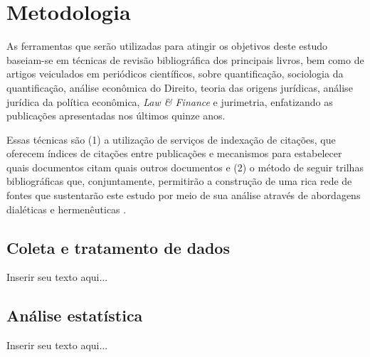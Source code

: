 
\chapter{Metodologia}
\label{chap_metodologia}

As ferramentas que serão utilizadas para atingir os objetivos deste estudo baseiam-se em técnicas de revisão bibliográfica dos principais livros, bem como de artigos veiculados em periódicos científicos, sobre quantificação, sociologia da quantificação, análise econômica do Direito, teoria das origens jurídicas, análise jurídica da política econômica, \emph{Law \& Finance} e jurimetria, enfatizando as publicações apresentadas nos últimos quinze anos.

Essas técnicas são (1) a utilização de serviços de indexação de citações, que oferecem índices de citações entre publicações e mecanismos para estabelecer quais documentos citam quais outros documentos e (2) o método de seguir trilhas bibliográficas que, conjuntamente, permitirão a construção de uma rica rede de fontes que sustentarão este estudo por meio de sua análise através de abordagens dialéticas e hermenêuticas \cite{booth2003craft}.

\section{Coleta e tratamento de dados}
\label{sec_coleta_e_tratamento_de_dados}

Inserir seu texto aqui...

\section{Análise estatística}
\label{sec_analise_estatistica}

Inserir seu texto aqui...
